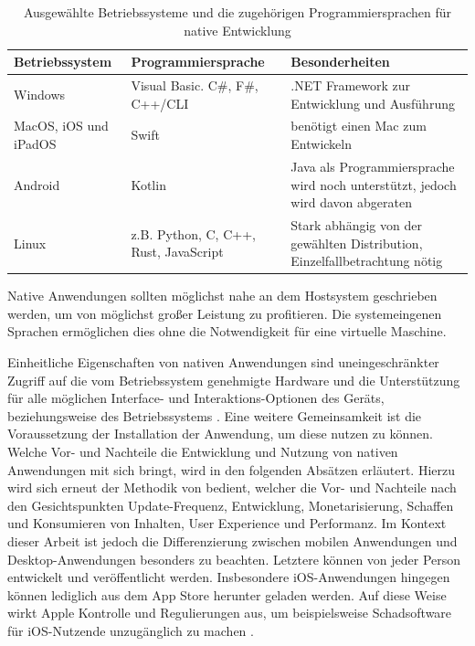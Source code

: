 \documentclass[a4paper]{scrartcl}
\begin{document}
\begin{table}[H]
 	\centering
 	\caption{Ausgewählte Betriebssysteme und die zugehörigen Programmiersprachen für native Entwicklung}
 	\begin{center}
 		\begin{tabularx}{\linewidth}{| Y | Y | Y |}
 			\hline
 			\textbf{Betriebssystem} & \textbf{Programmiersprache} & \textbf{Besonderheiten} \\
 			\hline \hline
 			Windows & Visual Basic. C\#, F\#, C++/CLI & .NET Framework zur Entwicklung und Ausführung \autocite{.NET_Microsoft} \\
 			\hline
 			MacOS, iOS und iPadOS & Swift & benötigt einen Mac zum Entwickeln \autocite{Swift_Apple} \\
 			\hline
 			Android & Kotlin & Java als Programmiersprache wird noch unterstützt, jedoch wird davon abgeraten \autocite{Kotlin_Android} \\
 			\hline
 			Linux & z.B. Python, C, C++, Rust, JavaScript & Stark abhängig von der gewählten Distribution, Einzelfallbetrachtung nötig \autocite{Linux_App} \\
 			\hline
 		\end{tabularx}
 	\end{center}
 	Native Anwendungen sollten möglichst nahe an dem Hostsystem geschrieben werden, um von möglichst großer Leistung zu profitieren. Die systemeingenen Sprachen ermöglichen dies ohne die Notwendigkeit für eine virtuelle Maschine.
 \end{table}
 
 Einheitliche Eigenschaften von nativen Anwendungen sind uneingeschränkter Zugriff auf die vom Betriebssystem genehmigte Hardware und die Unterstützung für alle möglichen Interface- und Interaktions-Optionen des Geräts, beziehungsweise des Betriebssystems \autocite[28]{Jobe}. Eine weitere Gemeinsamkeit ist die Voraussetzung der Installation der Anwendung, um diese nutzen zu können. \\
 
 Welche Vor- und Nachteile die Entwicklung und Nutzung von nativen Anwendungen mit sich bringt, wird in den folgenden Absätzen erläutert. Hierzu wird sich erneut der Methodik von \textcite[28]{Jobe} bedient, welcher die Vor- und Nachteile nach den Gesichtspunkten Update-Frequenz, Entwicklung, Monetarisierung, Schaffen und Konsumieren von Inhalten, User Experience und Performanz. Im Kontext dieser Arbeit ist jedoch die Differenzierung zwischen mobilen Anwendungen und Desktop-Anwendungen besonders zu beachten. Letztere können von jeder Person entwickelt und veröffentlicht werden. Insbesondere iOS-Anwendungen hingegen können lediglich aus dem App Store herunter geladen werden. Auf diese Weise wirkt Apple Kontrolle und Regulierungen aus, um beispielsweise Schadsoftware für iOS-Nutzende unzugänglich zu machen \autocite{Appstore_Guildelines}.
\end{document}
